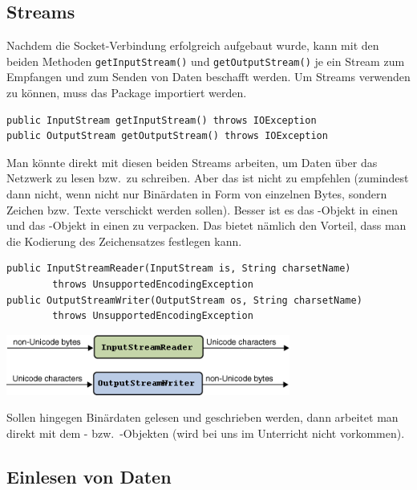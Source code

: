 \subsection{Streams}

Nachdem die Socket-Verbindung erfolgreich aufgebaut wurde, kann mit den beiden
Methoden \lstinline|getInputStream()| und \lstinline|getOutputStream()| je ein
Stream zum Empfangen und zum Senden von Daten beschafft werden. Um Streams
verwenden zu können, muss das Package  importiert werden.

\begin{lstlisting}
public InputStream getInputStream() throws IOException
public OutputStream getOutputStream() throws IOException
\end{lstlisting}

Man könnte direkt mit diesen beiden Streams arbeiten, um Daten über das
Netzwerk zu lesen bzw.\ zu schreiben. Aber das ist nicht zu empfehlen (zumindest
dann nicht, wenn nicht nur Binärdaten in Form von einzelnen Bytes, sondern
Zeichen bzw. Texte verschickt werden sollen). Besser ist es das
-Objekt in einen  und das
-Objekt in einen  zu verpacken.
Das bietet nämlich den Vorteil, dass man die Kodierung des Zeichensatzes
festlegen kann.

\begin{lstlisting}
public InputStreamReader(InputStream is, String charsetName) 
        throws UnsupportedEncodingException
public OutputStreamWriter(OutputStream os, String charsetName) 
        throws UnsupportedEncodingException
\end{lstlisting}

\begin{center}
\includegraphics[width=0.7\textwidth]{./inf/SEKII/43_Java_ClientServer/StreamEncoding.png}
\end{center}

Sollen hingegen Binärdaten gelesen und geschrieben werden, dann arbeitet man
direkt mit dem - bzw.\ -Objekten
(wird bei uns im Unterricht nicht vorkommen).

\subsection{Einlesen von Daten}

